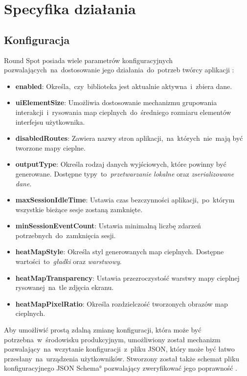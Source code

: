 \section{Specyfika działania}

\subsection{Konfiguracja}
\label{sec:rs_config}
Round Spot posiada wiele parametrów konfiguracyjnych pozwalających~na~dostosowanie jego działania~do~potrzeb twórcy aplikacji \cite{RoundSpot_Config_Docs}:
\begin{itemize}
	\item {\bf enabled}: Określa,~czy~biblioteka jest aktualnie aktywna~i~zbiera dane.
	\item {\bf uiElementSize}: Umożliwia dostosowanie mechanizmu grupowania interakcji~i~rysowania map cieplnych~do~średniego rozmiaru elementów interfejsu użytkownika.
	\item {\bf disabledRoutes}: Zawiera nazwy stron aplikacji,~na~których~nie~mają być tworzone mapy cieplne.
	\item {\bf outputType}: Określa rodzaj danych wyjściowych, które powinny być generowane. Dostępne typy~to~{\it przetwarzanie lokalne} oraz {\it zserializowane dane}.
	\item {\bf maxSessionIdleTime}: Ustawia czas bezczynności aplikacji,~po~którym wszystkie bieżące sesje zostaną zamknięte.
	\item {\bf minSessionEventCount}: Ustawia minimalną liczbę zdarzeń potrzebnych~do~zamknięcia sesji.
	\item {\bf heatMapStyle}: Określa styl generowanych map cieplnych. Dostępne wartości~to~{\it gładki} oraz {\it warstwowy}.
	\item {\bf heatMapTransparency}: Ustawia przezroczystość warstwy mapy cieplnej rysowanej~na~tle zdjęcia ekranu. 
	\item {\bf heatMapPixelRatio}: Określa rozdzielczość tworzonych obrazów map cieplnych.
\end{itemize}

Aby umożliwić prostą zdalną zmianę konfiguracji, która może być potrzebna~w~środowisku produkcyjnym, umożliwiony został mechanizm pozwalający~na~wczytanie konfiguracji~z~pliku JSON, który może być łatwo przesłany~na~urządzenia użytkowników. Stworzony został także schemat pliku konfiguracyjnego \ang{JSON Schema} pozwalający zweryfikować jego poprawność \cite{RoundSpot_Config_Schema}.

